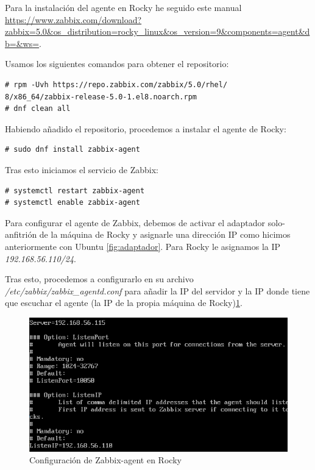 Para la instalación del agente en Rocky he seguido este manual 
\url{https://www.zabbix.com/download?zabbix=5.0&os_distribution=rocky_linux&os_version=9&components=agent&db=&ws=}.

Usamos los siguientes comandos para obtener el repositorio:

\begin{lstlisting}
# rpm -Uvh https://repo.zabbix.com/zabbix/5.0/rhel/
8/x86_64/zabbix-release-5.0-1.el8.noarch.rpm
# dnf clean all 
\end{lstlisting}

Habiendo añadido el repositorio, procedemos a instalar el agente de Rocky:

\begin{lstlisting}
# sudo dnf install zabbix-agent
\end{lstlisting}

Tras esto iniciamos el servicio de Zabbix:

\begin{lstlisting}
# systemctl restart zabbix-agent
# systemctl enable zabbix-agent
\end{lstlisting}

Para configurar el agente de Zabbix, debemos de activar el adaptador solo-anfitrión de la máquina de Rocky y asignarle una dirección IP como hicimos anteriormente con Ubuntu \ref{fig:adaptador}. Para Rocky le asignamos la IP \textit{192.168.56.110/24}. 

Tras esto, procedemos a configurarlo en su archivo \textit{/etc/zabbix/zabbix\_agentd.conf} para añadir la IP del servidor y la IP donde tiene que escuchar el agente (la IP de la propia máquina de Rocky)\ref{fig:agent}.

\begin{figure}[H]
  \centering
  \includegraphics[scale=0.7]{Captura13}
  \caption{Configuración de Zabbix-agent en Rocky}
  \label{fig:agent}
\end{figure}

